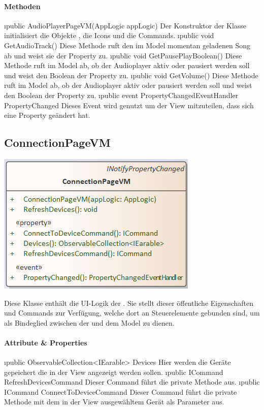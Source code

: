 \documentclass[../entwurf.tex]{subfiles}
\begin{document}
\paragraph{Methoden}
\begin{itemize}
	\i{public AudioPlayerPageVM(AppLogic appLogic)} Der Konstruktor der Klasse initialisiert die Objekte , die Icons und die Commands.
	\i{public void GetAudioTrack()} Diese Methode ruft den im Model momentan geladenen Song ab und weist sie der Property  zu.
	\i{public void GetPausePlayBoolean()} Diese Methode ruft im Model ab, ob der Audioplayer aktiv oder pausiert werden soll und weist den Boolean der Property  zu.
	\i{public void GetVolume()} Diese Methode ruft im Model ab, ob der Audioplayer aktiv oder pausiert werden soll und weist den Boolean der Property  zu.
	\i{public event PropertyChangedEventHandler PropertyChanged} Dieses Event wird genutzt um der View mitzuteilen, dass sich eine Property geändert hat.
\end{itemize}
\subsection{ConnectionPageVM}
\begin{minipage}{0.55\textwidth}
\includegraphics[scale=0.75]{../graphics/vm_klassen/ConnectionPageVM.png}
\end{minipage}
\begin{minipage}{0.45\textwidth}
Diese Klasse enthält die UI-Logik der . Sie stellt dieser öffentliche Eigenschaften und Commands zur Verfügung, welche dort an Steuerelemente gebunden sind, um als Bindeglied zwischen der  und dem Model zu dienen.
\end{minipage}
\paragraph{Attribute \& Properties}
\begin{itemize}
	\i{public ObservableCollection<IEarable> Devices} Hier werden die Geräte gepeichert die in der View angezeigt werden sollen.
	\i{public ICommand RefreshDevicesCommand} Dieser Command führt die private Methode  aus. 
	\i{public ICommand ConnectToDeviceCommand} Dieser Command führt die private Methode  mit dem in der View ausgewähltem Gerät als Parameter aus. 
\end{itemize}
\end{document}
